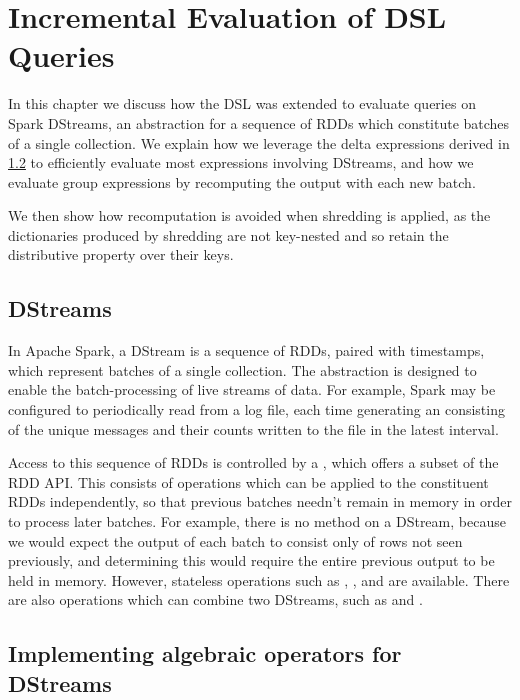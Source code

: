 \chapter{Incremental Evaluation of DSL Queries} \label{incrementalisation}

In this chapter we discuss how the DSL was extended to evaluate queries on Spark DStreams, an abstraction for a sequence of RDDs which constitute batches of a single collection. We explain how we leverage the delta expressions derived in \ref{} to efficiently evaluate most expressions involving DStreams, and how we evaluate group expressions by recomputing the output with each new batch.

We then show how recomputation is avoided when shredding is applied, as the dictionaries produced by shredding are not key-nested and so retain the distributive property over their keys.

\section{DStreams}

In Apache Spark, a DStream \cite{dstream} is a sequence of RDDs, paired with timestamps, which represent batches of a single collection. The abstraction is designed to enable the batch-processing of live streams of data. For example, Spark may be configured to periodically read from a log file, each time generating an  consisting of the unique messages and their counts written to the file in the latest interval.

Access to this sequence of RDDs is controlled by a , which offers a subset of the RDD API. This consists of operations which can be applied to the constituent RDDs independently, so that previous batches needn't remain in memory in order to process later batches. For example, there is no method  on a DStream, because we would expect the output of each batch to consist only of rows not seen previously, and determining this would require the entire previous output to be held in memory. However, stateless operations such as , , and  are available. There are also operations which can combine two DStreams, such as  and .


\section{Implementing algebraic operators for DStreams}

